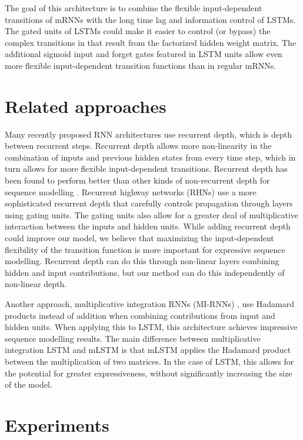 \documentclass{article}
\begin{document}
The goal of this architecture is to combine the flexible input-dependent transitions of mRNNs with the long time lag and information control of LSTMs. The gated units of LSTMs could make it easier to control (or bypass) the complex transitions in that result from the factorized hidden weight matrix. The additional sigmoid input and forget gates featured in LSTM units allow even more flexible input-dependent transition functions than in regular mRNNs. 

\section{Related approaches}
Many recently proposed RNN architectures use recurrent depth, which is depth between recurrent steps. Recurrent depth allows more non-linearity in the combination of inputs and previous hidden states from every time step, which in turn allows for more flexible input-dependent transitions. Recurrent depth has been found to perform better than other kinds of non-recurrent depth for sequence modelling \citep{zhang2016}. Recurrent highway networks (RHNs) \citep{zilly2017} use a more sophisticated recurrent depth that carefully controls propagation through layers using gating units. The gating units also allow for a greater deal of multiplicative interaction between the inputs and hidden units. While adding recurrent depth could improve our model, we believe that maximizing the input-dependent flexibility of the transition function is more important for expressive sequence modelling. Recurrent depth can do this through non-linear layers combining hidden and input contributions, but our method can do this independently of non-linear depth.

 Another approach, multiplicative integration RNNs (MI-RNNs) \citep{wu2016}, use Hadamard products instead of addition when combining contributions from input and hidden units. When applying this to LSTM, this architecture achieves impressive sequence modelling results. The main difference between multiplicative integration LSTM and mLSTM is that mLSTM applies the Hadamard product between the multiplication of two matrices. In the case of LSTM, this allows for the potential for greater expressiveness, without significantly increasing the size of the model. 


\section{Experiments}
\end{document}
